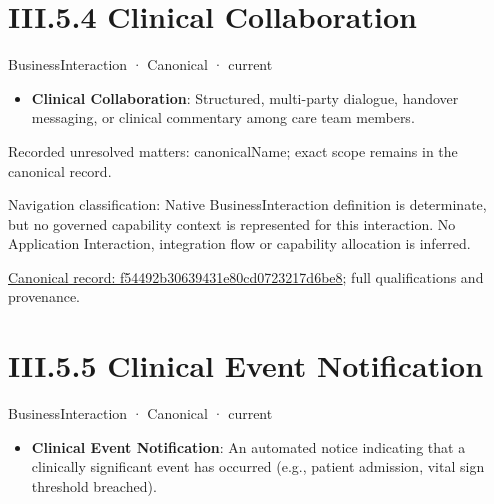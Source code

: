 \section*{III.5.4 Clinical Collaboration}
\label{navigation:III.5.4}

\label{element:f54492b30639431e80cd0723217d6be8}
{\small BusinessInteraction · Canonical · current}\par

\begin{itemize}


\item \textbf{Clinical Collaboration}: Structured, multi-party dialogue, handover messaging, or clinical commentary among care team members.

\end{itemize}

{\small Recorded unresolved matters: canonicalName; exact scope remains in the canonical record.}\par
{\small Navigation classification: Native BusinessInteraction definition is determinate, but no governed capability context is represented for this interaction. No Application Interaction, integration flow or capability allocation is inferred.}\par
{\footnotesize \href{../../../../../../../continuum/business/business-interaction/f54492b30639431e80cd0723217d6be8.md}{Canonical record: f54492b30639431e80cd0723217d6be8}; full qualifications and provenance.}\par
\section*{III.5.5 Clinical Event Notification}
\label{navigation:III.5.5}

\label{element:d2153d1057d740fea1665d71ff66dd1c}
{\small BusinessInteraction · Canonical · current}\par

\begin{itemize}


\item \textbf{Clinical Event Notification}: An automated notice indicating that a clinically significant event has occurred (e.g., patient admission, vital sign threshold breached).

\end{itemize}

